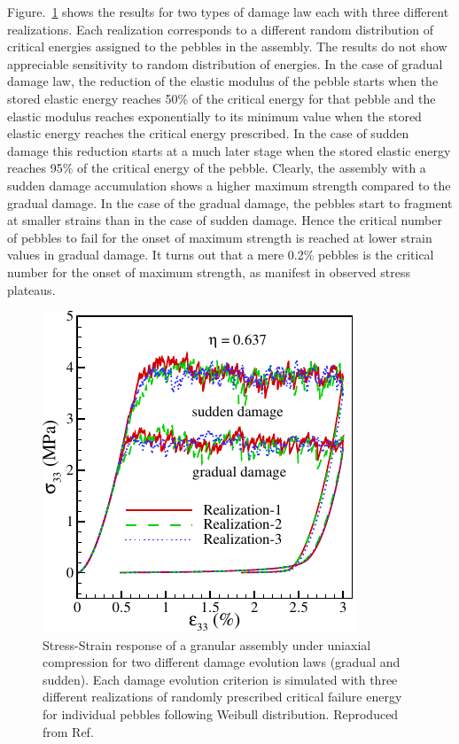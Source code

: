 Figure.~\ref{fig:stress-strain-effect} shows the results for two types of damage law each with three different realizations.\cite{ying2011isfnt} Each realization corresponds to a different random distribution of critical energies assigned to the pebbles in the assembly. The results do not show appreciable sensitivity to random distribution of energies. In the case of gradual damage law, the reduction of the elastic modulus of the pebble starts when the stored elastic energy reaches 50\% of the critical energy for that pebble and the elastic modulus reaches exponentially to its minimum value when the stored elastic energy reaches the critical energy prescribed. In the case of sudden damage this reduction starts at a much later stage when the stored elastic energy reaches 95\% of the critical energy of the pebble. Clearly, the assembly with a sudden damage accumulation shows a higher maximum strength compared to the gradual damage. In the case of the gradual damage, the pebbles start to fragment at smaller strains than in the case of sudden damage. Hence the critical number of pebbles to fail for the onset of maximum strength is reached at lower strain values in gradual damage. It turns out that a mere 0.2\% pebbles is the critical number for the onset of maximum strength, as manifest in observed stress plateaus.

\begin{figure}[!ht]
\centering
\includegraphics[width=\singleimagewidth]{figures/Fig-5}
\caption{Stress-Strain response of a granular assembly under uniaxial compression for two different damage evolution laws (gradual and sudden). Each damage evolution criterion is simulated with three different realizations of randomly prescribed critical failure energy for individual pebbles following Weibull distribution. Reproduced from Ref.\cite{ying2011isfnt}}
\label{fig:stress-strain-effect}
\end{figure}

